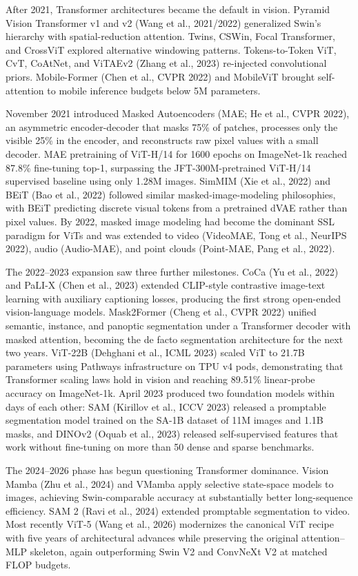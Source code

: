After 2021, Transformer architectures became the default in vision. Pyramid Vision Transformer v1 and v2 (Wang et al., 2021/2022) generalized Swin's hierarchy with spatial-reduction attention. Twins, CSWin, Focal Transformer, and CrossViT explored alternative windowing patterns. Tokens-to-Token ViT, CvT, CoAtNet, and ViTAEv2 (Zhang et al., 2023) re-injected convolutional priors. Mobile-Former (Chen et al., CVPR 2022) and MobileViT brought self-attention to mobile inference budgets below 5M parameters.

November 2021 introduced Masked Autoencoders (MAE; He et al., CVPR 2022), an asymmetric encoder-decoder that masks 75\% of patches, processes only the visible 25\% in the encoder, and reconstructs raw pixel values with a small decoder. MAE pretraining of ViT-H/14 for 1600 epochs on ImageNet-1k reached 87.8\% fine-tuning top-1, surpassing the JFT-300M-pretrained ViT-H/14 supervised baseline using only 1.28M images. SimMIM (Xie et al., 2022) and BEiT (Bao et al., 2022) followed similar masked-image-modeling philosophies, with BEiT predicting discrete visual tokens from a pretrained dVAE rather than pixel values. By 2022, masked image modeling had become the dominant SSL paradigm for ViTs and was extended to video (VideoMAE, Tong et al., NeurIPS 2022), audio (Audio-MAE), and point clouds (Point-MAE, Pang et al., 2022).

The 2022--2023 expansion saw three further milestones. CoCa (Yu et al., 2022) and PaLI-X (Chen et al., 2023) extended CLIP-style contrastive image-text learning with auxiliary captioning losses, producing the first strong open-ended vision-language models. Mask2Former (Cheng et al., CVPR 2022) unified semantic, instance, and panoptic segmentation under a Transformer decoder with masked attention, becoming the de facto segmentation architecture for the next two years. ViT-22B (Dehghani et al., ICML 2023) scaled ViT to 21.7B parameters using Pathways infrastructure on TPU v4 pods, demonstrating that Transformer scaling laws hold in vision and reaching 89.51\% linear-probe accuracy on ImageNet-1k. April 2023 produced two foundation models within days of each other: SAM (Kirillov et al., ICCV 2023) released a promptable segmentation model trained on the SA-1B dataset of 11M images and 1.1B masks, and DINOv2 (Oquab et al., 2023) released self-supervised features that work without fine-tuning on more than 50 dense and sparse benchmarks.

The 2024--2026 phase has begun questioning Transformer dominance. Vision Mamba (Zhu et al., 2024) and VMamba apply selective state-space models to images, achieving Swin-comparable accuracy at substantially better long-sequence efficiency. SAM 2 (Ravi et al., 2024) extended promptable segmentation to video. Most recently ViT-5 (Wang et al., 2026) modernizes the canonical ViT recipe with five years of architectural advances while preserving the original attention--MLP skeleton, again outperforming Swin V2 and ConvNeXt V2 at matched FLOP budgets.

